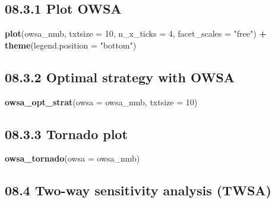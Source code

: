 \documentclass[]{article}
\newenvironment{Shaded}{\begin{snugshade}}{\end{snugshade}}
\newcommand{\KeywordTok}[1]{\textcolor[rgb]{0.13,0.29,0.53}{\textbf{#1}}}
\newcommand{\DataTypeTok}[1]{\textcolor[rgb]{0.13,0.29,0.53}{#1}}
\newcommand{\DecValTok}[1]{\textcolor[rgb]{0.00,0.00,0.81}{#1}}
\newcommand{\StringTok}[1]{\textcolor[rgb]{0.31,0.60,0.02}{#1}}
\newcommand{\OperatorTok}[1]{\textcolor[rgb]{0.81,0.36,0.00}{\textbf{#1}}}
\newcommand{\NormalTok}[1]{#1}
\begin{document}
\subsection{08.3.1 Plot OWSA}\label{plot-owsa}

\begin{Shaded}
\begin{Highlighting}[]
\KeywordTok{plot}\NormalTok{(owsa_nmb, }\DataTypeTok{txtsize =} \DecValTok{10}\NormalTok{, }\DataTypeTok{n_x_ticks =} \DecValTok{4}\NormalTok{, }
     \DataTypeTok{facet_scales =} \StringTok{"free"}\NormalTok{) }\OperatorTok{+}
\StringTok{     }\KeywordTok{theme}\NormalTok{(}\DataTypeTok{legend.position =} \StringTok{"bottom"}\NormalTok{)}
\end{Highlighting}
\end{Shaded}

\subsection{08.3.2 Optimal strategy with
OWSA}\label{optimal-strategy-with-owsa}

\begin{Shaded}
\begin{Highlighting}[]
\KeywordTok{owsa_opt_strat}\NormalTok{(}\DataTypeTok{owsa =}\NormalTok{ owsa_nmb, }\DataTypeTok{txtsize =} \DecValTok{10}\NormalTok{)}
\end{Highlighting}
\end{Shaded}

\subsection{08.3.3 Tornado plot}\label{tornado-plot}

\begin{Shaded}
\begin{Highlighting}[]
\KeywordTok{owsa_tornado}\NormalTok{(}\DataTypeTok{owsa =}\NormalTok{ owsa_nmb)}
\end{Highlighting}
\end{Shaded}

\subsection{08.4 Two-way sensitivity analysis
(TWSA)}\label{two-way-sensitivity-analysis-twsa}
\end{document}
